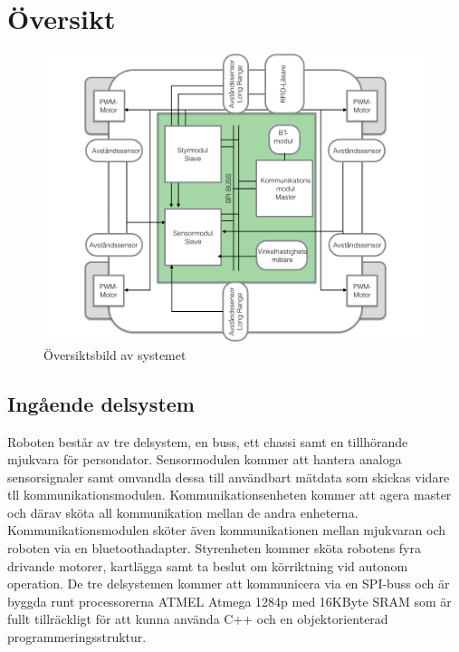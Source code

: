 \documentclass[a4paper,12pt,fleqn]{article}
\begin{document}
\addto\captionsswedish{\renewcommand{\contentsname}{Innehållsförteckning}}

\tableofcontents
\thispagestyle{fancy}
\newpage

\section{Översikt}

\begin{figure}[htp] %
  \begin{center}
  \includegraphics[keepaspectratio=true,width=\linewidth]{overview}  %
  \end{center}
  \caption{Översiktsbild av systemet} %
  \label{fig:case1flow}
\end{figure}

\subsection{Ingående delsystem}
Roboten består av tre delsystem, en buss, ett chassi samt en tillhörande mjukvara för persondator. Sensormodulen kommer att hantera analoga sensorsignaler samt omvandla dessa till användbart mätdata som skickas vidare tll kommunikationsmodulen. 
Kommunikationsenheten kommer att agera master och därav sköta all kommunikation mellan de andra enheterna. Kommunikationsmodulen sköter även kommunikationen mellan mjukvaran och roboten via en bluetoothadapter. Styrenheten kommer sköta robotens fyra drivande motorer, kartlägga samt ta beslut om körriktning vid autonom operation.
De tre delsystemen kommer att kommunicera via en SPI-buss och är byggda runt processorerna ATMEL Atmega 1284p med 16KByte SRAM som är fullt tillräckligt för att kunna använda C++ och en objektorienterad programmeringsstruktur.
\end{document}
